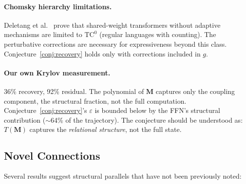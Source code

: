 \documentclass[11pt, a4paper]{article}
\newcommand{\M}{\mathbf{M}}
\theoremstyle{plain}
\theoremstyle{definition}
\theoremstyle{remark}
\begin{document}
\paragraph{Chomsky hierarchy limitations.}
Deletang et al.~\cite{deletang2023chomsky} prove that shared-weight transformers without adaptive mechanisms are limited to $\mathrm{TC}^0$ (regular languages with counting).
The perturbative corrections are necessary for expressiveness beyond this class.
Conjecture~\ref{conj:recovery} holds only with corrections included in $g$.

\paragraph{Our own Krylov measurement.}
36\% recovery, 92\% residual.
The polynomial of $\M$ captures only the coupling component, the structural fraction, not the full computation.
Conjecture~\ref{conj:recovery}'s $\varepsilon$ is bounded below by the FFN's structural contribution ($\sim$64\% of the trajectory).
The conjecture should be understood as: $T(\M)$ captures the \emph{relational structure}, not the full state.

\subsection{Novel Connections}

Several results suggest structural parallels that have not been previously noted:
\end{document}
